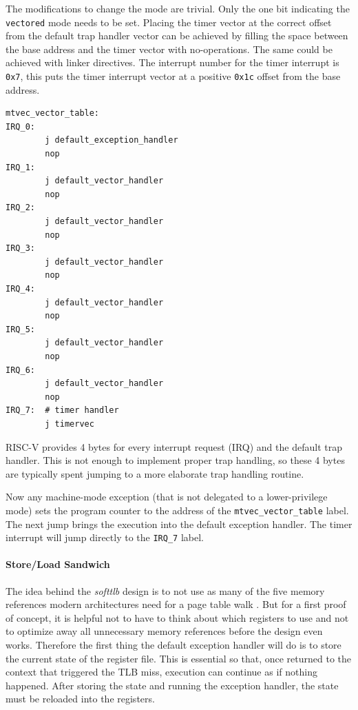 The modifications to change the mode are trivial. Only the one bit indicating the \texttt{vectored} mode
needs to be set.
Placing the timer vector at the correct offset from the default trap handler vector can be achieved by
filling the space between the base address and the timer vector with no-operations. The same could be
achieved with linker directives.
The interrupt number for the timer interrupt is \texttt{0x7}, this puts the timer interrupt vector
at a positive \texttt{0x1c} offset from the base address.

\begin{lstlisting}[language={[RISC-V]Assembler},float=h!,
    label={lst:defaultTrapHandler}, caption={Vectored Trap Handler Routine}]
mtvec_vector_table:
IRQ_0:
        j default_exception_handler
        nop
IRQ_1:
        j default_vector_handler
        nop
IRQ_2:
        j default_vector_handler
        nop
IRQ_3:
        j default_vector_handler
        nop
IRQ_4:
        j default_vector_handler
        nop
IRQ_5:
        j default_vector_handler
        nop
IRQ_6:
        j default_vector_handler
        nop
IRQ_7:  # timer handler
        j timervec
\end{lstlisting}


RISC-V provides 4 bytes for every interrupt request (IRQ) and the default trap handler. This is not enough
to implement proper trap handling, so these 4 bytes are typically spent jumping to a more elaborate trap
handling routine.

Now any machine-mode exception (that is not delegated to a lower-privilege mode) sets the program counter
to the address of the \texttt{mtvec\_vector\_table} label. The next jump brings the execution into
the default exception handler.
The timer interrupt will jump directly to the \texttt{IRQ\_7} label.

\paragraph{Store/Load Sandwich} The idea behind the \textit{softtlb} design is to not use as many of the five
memory references modern architectures need for a page table walk \cite{intel5LevelPaging5Level2017}. But
for a first proof of concept, it is helpful not to have to think about which registers to use and not to optimize
away all unnecessary memory references before the design even works.
Therefore the first thing the default exception handler will do is to store the current state of the register
file.
This is essential so that, once returned to the context that triggered the TLB miss, execution can continue
as if nothing happened.
After storing the state and running the exception handler, the state must be reloaded into the registers.

